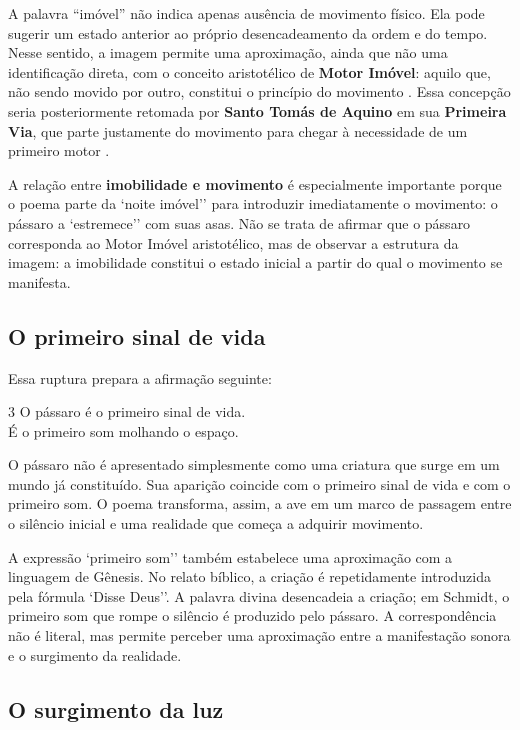 A palavra ``imóvel'' não indica apenas ausência de movimento físico. Ela pode
sugerir um estado anterior ao próprio desencadeamento da ordem e do tempo.
Nesse sentido, a imagem permite uma aproximação, ainda que não uma identificação
direta, com o conceito aristotélico de \textbf{Motor Imóvel}: aquilo que, não
sendo movido por outro, constitui o princípio do movimento
\cite[Livro XII, 7]{aristoteles2014metafisica}. Essa concepção seria posteriormente
retomada por \textbf{Santo Tomás de Aquino} em sua \textbf{Primeira Via}, que
parte justamente do movimento para chegar à necessidade de um primeiro motor
\cite[Primeira Parte, q. 2, a. 3]{aquinas2017sumateologica}.

A relação entre \textbf{imobilidade e movimento} é especialmente importante
porque o poema parte da `noite imóvel'' para introduzir imediatamente o
movimento: o pássaro a `estremece'' com suas asas. Não se trata de afirmar que
o pássaro corresponda ao Motor Imóvel aristotélico, mas de observar a estrutura
da imagem: a imobilidade constitui o estado inicial a partir do qual o movimento
se manifesta.

\subsection{O primeiro sinal de vida}

Essa ruptura prepara a afirmação seguinte:

\begin{poemquote}[0.49\textwidth]{3}
O pássaro é o primeiro sinal de vida. \\
É o primeiro som molhando o espaço.
\end{poemquote}

O pássaro não é apresentado simplesmente como uma criatura que surge em um
mundo já constituído. Sua aparição coincide com o primeiro sinal de vida e com
o primeiro som. O poema transforma, assim, a ave em um marco de passagem entre
o silêncio inicial e uma realidade que começa a adquirir movimento.

A expressão `primeiro som'' também estabelece uma aproximação com a linguagem
de Gênesis. No relato bíblico, a criação é repetidamente introduzida pela
fórmula `Disse Deus''. A palavra divina desencadeia a criação; em Schmidt, o
primeiro som que rompe o silêncio é produzido pelo pássaro. A correspondência
não é literal, mas permite perceber uma aproximação entre a manifestação
sonora e o surgimento da realidade.

\subsection{O surgimento da luz}

